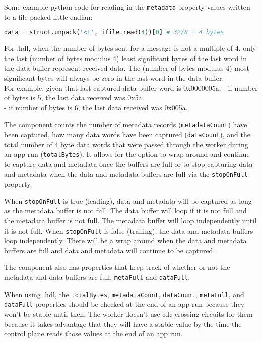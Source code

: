 \begin{flushleft}
Some example python code for reading in the \texttt{metadata} property values written to a file packed little-endian:
    \begin{lstlisting}[language=Python]
    data = struct.unpack('<I', ifile.read(4))[0] # 32/8 = 4 bytes
    \end{lstlisting}


For {\comp}.hdl, when the number of bytes sent for a message is not a multiple of 4, only the
last (number of bytes modulus 4) least significant bytes of the last word
in the data buffer represent received data. The (number of bytes modulus 4)
most significant bytes will always be zero in the last word in the data
buffer. \\
For example, given that last captured data buffer word is 0x0000005a: \newline
- if number of bytes is 5, the last data received was 0x5a. \\
- if number of bytes is 6, the last data received was 0x005a. \newline


The {\comp} component counts the number of metadata records (\texttt{metadataCount}) have been captured, how many data words have been captured (\texttt{dataCount}), and the total number of 4 byte data words that were passed through the worker during an app run (\texttt{totalBytes}). It allows for the option to wrap around and continue to capture data and metadata once the buffers are full or to stop capturing data and metadata when the data and metadata buffers are full via the \texttt{stopOnFull} property. \newline

When \texttt{stopOnFull} is true (leading), data and metadata will be captured as long as the metadata buffer is not full. The data buffer will loop if it is not full and the metadata buffer is not full. The metadata buffer will loop independently until it is not full. When \texttt{stopOnFull} is false (trailing), the data and metadata buffers loop independently. There will be a wrap around when the data and metadata buffers are full and data and metadata will continue to be captured.  \newline

The component also has properties that keep track of whether or not the metadata and data buffers are full; \texttt{metaFull} and \texttt{dataFull}. \newline

When using {\comp}.hdl, the \texttt{totalBytes}, \texttt{metadataCount},  \texttt{dataCount}, \texttt{metaFull}, and \texttt{dataFull} properties should be checked at the end of an app run because they won't be stable until then. The worker doesn't use cdc crossing circuits for them because it takes advantage that they will have a stable value by the time the control plane reads those values at the end of an app run.

\end{flushleft}

